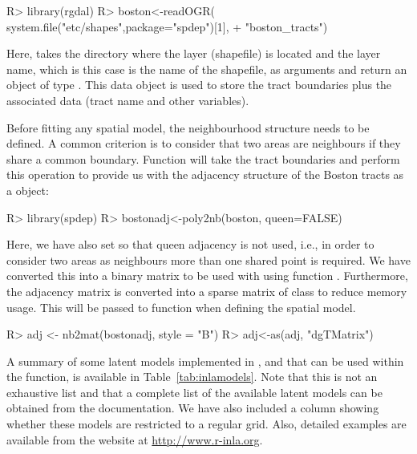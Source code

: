 \documentclass[article]{jss}
\begin{document}
\begin{Schunk}
\begin{Sinput}
R> library(rgdal)
R> boston<-readOGR( system.file("etc/shapes",package="spdep")[1], 
+     "boston_tracts")
\end{Sinput}
\end{Schunk}
\noindent
Here,  takes the directory where the layer (shapefile) is 
located and the layer name, which is this case is the name of the shapefile,
as arguments and return an object of type .
This data object is used to store the tract boundaries plus the associated
data (tract name and other variables). 

Before fitting any spatial model, the neighbourhood structure needs to be
defined.  A common criterion is to consider that two areas are neighbours if 
they share a common boundary. Function  will take the tract
boundaries and perform this operation to provide us with the adjacency structure
of the Boston tracts as a  object:

\begin{Schunk}
\begin{Sinput}
R> library(spdep)
R> bostonadj<-poly2nb(boston, queen=FALSE)
\end{Sinput}
\end{Schunk}
\noindent
Here, we have also set  so that queen adjacency is not used,
i.e., in order to consider two areas as neighbours more than one shared point
is required.  We have converted this into a binary matrix to be used with
 using function .  Furthermore, the adjacency matrix
is converted into a sparse matrix of class  to reduce memory
usage.  This will be passed to function  when defining the spatial
model. 


\begin{Schunk}
\begin{Sinput}
R> adj <- nb2mat(bostonadj, style = "B")
R> adj<-as(adj, "dgTMatrix")
\end{Sinput}
\end{Schunk}
\noindent

A summary of some latent models implemented in , and that can be
used within the  function, is available in
Table~\ref{tab:inlamodels}. Note that this is not an exhaustive list and that a
complete list of the available latent models can be obtained from the
 documentation. We have also included a column showing whether these models are
restricted to a regular grid. Also, detailed examples are available from the
 website at \url{http://www.r-inla.org}.
\end{document}
